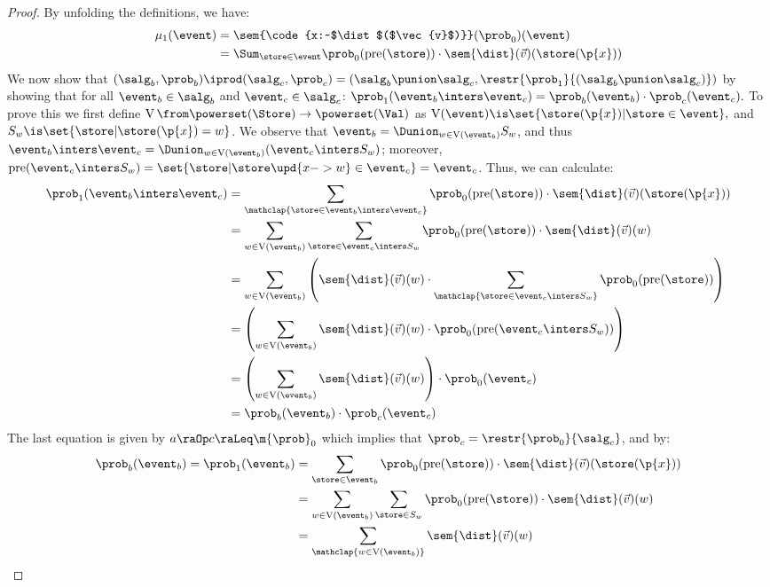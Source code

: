\begin{proof}
  By unfolding the definitions, we have:
  \begin{align*}
    \mu_1(\event) &=
      \sem{\code{x:~$\dist$($\vec{v}$)}}(\prob_0)(\event)
\\&=
      \Sum_{\store \in \event}
        \prob_0(\Pre(\store)) \cdot \sem{\dist}(\vec{v})(\store(\p{x}))
  \end{align*}
  We now show that
  $
    (\salg_b, \prob_b) \iprod (\salg_c, \prob_c)
    =
    (\salg_b \punion \salg_c, \restr{\prob_1}{(\salg_b \punion \salg_c)})
  $
  by showing that
  for all $\event_b \in \salg_b$ and
          $\event_c \in \salg_c$:
  $
    \prob_1(\event_b \inters \event_c)
    =
    \prob_b(\event_b) \cdot \prob_c(\event_c).
  $
  \newcommand{\valOf}{\operatorname{V}}
  To prove this we first
  define $\valOf \from \powerset(\Store) \to \powerset(\Val)$ as
  $
    \valOf(\event) \is
      \set{ \store(\p{x}) | \store \in \event },
  $
  and $ S_w \is \set{ \store | \store(\p{x}) = w } $.
  We observe that
  $
    \event_b   = \Dunion_{w \in \valOf(\event_b)} S_w
  $, and thus
  $
    \event_b \inters \event_c
    = \Dunion_{w \in \valOf(\event_b)} (\event_c \inters S_w)
  $;
  moreover,
  $
    \Pre(\event_c \inters S_w)
    = \set{ \store | \store\upd{x->w} \in \event_c } = \event_c
  $.
  Thus, we can calculate:
  \begin{align*}
    \prob_1(\event_b \inters \event_c)
      &=
    \sum_{\mathclap{\store \in \event_b \inters \event_c}}
      \prob_0(\Pre(\store)) \cdot \sem{\dist}(\vec{v})(\store(\p{x}))
    \\&=
    \sum_{w \in \valOf(\event_b)}
    \sum_{\store \in \event_c \inters S_{w}}
      \prob_0(\Pre(\store)) \cdot
      \sem{\dist}(\vec{v})(w)
    \\&=
    \sum_{w \in \valOf(\event_b)}
    \left(
      \sem{\dist}(\vec{v})(w) \cdot
      \sum_{\mathclap{\store \in \event_c \inters S_{w}}}
      \prob_0(\Pre(\store))
    \right)
    \\&=
    \left(
    \sum_{w \in \valOf(\event_b)}
      \sem{\dist}(\vec{v})(w)
      \cdot \prob_0(\Pre(\event_c \inters S_w))
    \right)
    \\&=
    \left(
    \sum_{w \in \valOf(\event_b)}
      \sem{\dist}(\vec{v})(w)
    \right)
    \cdot \prob_0(\event_c)
    \\&=
    \prob_b(\event_b) \cdot  \prob_c(\event_c)
  \end{align*}
The last equation is given by
  $ a\raOp c \raLeq  \m{\prob}_0 $ which implies that $ \prob_c = \restr{\prob_0}{\salg_c} $, and by:
  \begin{align*}
    \prob_b(\event_b)
      =
    \prob_1(\event_b)
      &=
    \sum_{\store \in \event_b}
      \prob_0(\Pre(\store)) \cdot \sem{\dist}(\vec{v})(\store(\p{x}))
    \\&=
    \sum_{w \in \valOf(\event_b)}
      \sum_{\store \in S_w}
        \prob_0(\Pre(\store)) \cdot \sem{\dist}(\vec{v})(w)
    \\&=
    \sum_{\mathclap{w \in \valOf(\event_b)}}
      \sem{\dist}(\vec{v})(w)
  \end{align*}


\end{proof}
